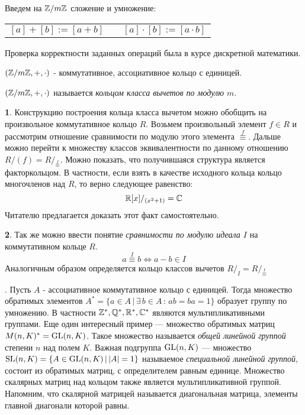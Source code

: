 \documentclass[../main.tex]{subfiles}
\begin{document}
Введем на $\mathbb{Z}/m\mathbb{Z}$ сложение и умножение:

\begin{center}
\begin{tabular}{l p{2.5cm} r}
    $[a] + [b ] := [a + b]$ &  & $[a] \cdot [b] := [a \cdot b]$
\end{tabular}
\end{center}

Проверка корректности заданных операций была в курсе дискретной математики.
\begin{theorem-non}
    $(\mathbb{Z}/m\mathbb{Z}, +, \cdot)$ - коммутативное, ассоциативное кольцо с единицей.
\end{theorem-non}
\begin{definition}
    $(\mathbb{Z}/m\mathbb{Z}, +, \cdot)$ называется \textit{кольцом класса вычетов по модулю $m$}.
\end{definition}


\textbf{1}. Конструкцию построения кольца класса вычетом можно обобщить на произвольное коммутативное кольцо $R$. Возьмем произвольный элемент $f \in R$ и рассмотрим отношение сравнимости по модулю этого элемента {\scriptsize${\overset{f}{\equiv}}$}. Дальше можно перейти к множеству классов эквивалентности по данному отношению $R/(f) = R/_{\overset{f}{\equiv}}$. Можно показать, что получившаяся структура является факторкольцом. В частности, если взять в качестве исходного кольца кольцо многочленов над $R$, то верно следующее равенство:
\begin{equation*}
    \mathbb{R}[x]/_{(x^2 + 1)} = \mathbb{C}
\end{equation*}
Читателю предлагается доказать этот факт самостоятельно.

\textbf{2}. Так же можно ввести понятие \textit{сравнимости по модулю идеала $I$} на коммутативном кольце $R$.
\begin{equation*}
    a \overset{I}{\equiv} b \iff a - b \in I
\end{equation*}
Аналогичным образом определяется кольцо классов вычетов $R/_I = R/_{{\overset{I}{\equiv}}}$

\textbf{}. Пусть $A$ - ассоциативное коммутативное кольцо с единицей. Тогда множество обратимых элементов \linebreak $A^{*} = \{a \in A \, | \, \exists \, b \in A \, : \, ab = ba = 1\}$ образует группу по умножению. В частности $\mathbb{Z}^{*}, \mathbb{Q}^{*}, \mathbb{R}^{*}, \mathbb{C}^{*}$ являются мультипликативными группами. Еще один интересный пример --- множество обратимых матриц $M(n, K)^{*} = \operatorname{GL}(n, K)$. Такое множество называется \textit{общей линейной группой} степени $n$ над полем $K$. Важная подгруппа $\operatorname{GL}(n, K)$ --- множество $\operatorname{SL}(n, K) = \{A \in \operatorname{GL}(n, K) \, | \, |A| = 1\}$ называемое \textit{специальной линейной группой}, состоит из обратимых матриц, с определителем равным единице. Множество скалярных матриц над кольцом также является мультипликативной группой. Напомним, что скалярной матрицей называется диагональная матрица, элементы главной диагонали которой равны.
\end{document}
